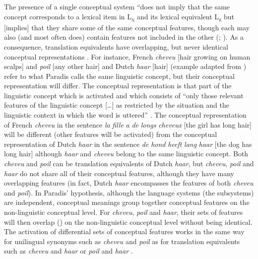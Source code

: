 The presence of a single conceptual system “does not imply that the same concept corresponds to a lexical item in L\textsubscript{x} and its lexical equivalent L\textsubscript{z} but [implies] that they share some of the same conceptual features, though each may also (and most often does) contain features not included in the other (\citealt{paradis_bilingual_1978, auger_representation_1997,de_groot_lexical_1997,Costaetal2000}; \citealt[198]{paradis_neurolinguistic_2004}). As a consequence, translation equivalents have overlapping, but never identical conceptual representations \citep[12]{kecskes_neurofunctional_2007}. For instance, French \textit{cheveu} [hair growing on human scalps] and \textit{poil} [any other hair] and Dutch \textit{haar} [hair] (example adapted from \citealt[201]{paradis_neurolinguistic_2004}) refer to what Paradis calls the same linguistic concept, but their conceptual representation will differ. The conceptual representation is that part of the linguistic concept which is activated and which consists of “only those relevant features of the linguistic concept […] as restricted by the situation and the linguistic context in which the word is uttered” \citep[12]{kecskes_neurofunctional_2007}. The conceptual representation of French \textit{cheveu} in the sentence \textit{la} \textit{fille} \textit{a} \textit{de} \textit{longs} \textit{cheveux} [the girl has long hair] will be different (other features will be activated) from the conceptual representation of Dutch \textit{haar} in the sentence \textit{de} \textit{hond} \textit{heeft} \textit{lang} \textit{haar} [the dog has long hair] although \textit{haar} and \textit{cheveu} belong to the same linguistic concept. Both \textit{cheveu} and \textit{poil} can be translation equivalents of Dutch \textit{haar}, but \textit{cheveu}, \textit{poil} and \textit{haar} do not share all of their conceptual features, although they have many overlapping features (in fact, Dutch \textit{haar} encompasses the features of both \textit{cheveu} and \textit{poil}). In Paradis’ hypothesis, although the language systems (the subsystems) are independent, conceptual meanings group together conceptual features on the non-linguistic conceptual level. For \textit{cheveu}, \textit{poil} and \textit{haar}, their sets of features will then overlap (\citeyear[13]{kecskes_neurofunctional_2007}) on the non-linguistic conceptual level without being identical. The activation of differential sets of conceptual features works in the same way for unilingual synonyms such as \textit{cheveu} and \textit{poil} as for translation equivalents such as \textit{cheveu} and \textit{haar} or \textit{poil} and \textit{haar} \citep[14]{kecskes_neurofunctional_2007}.

